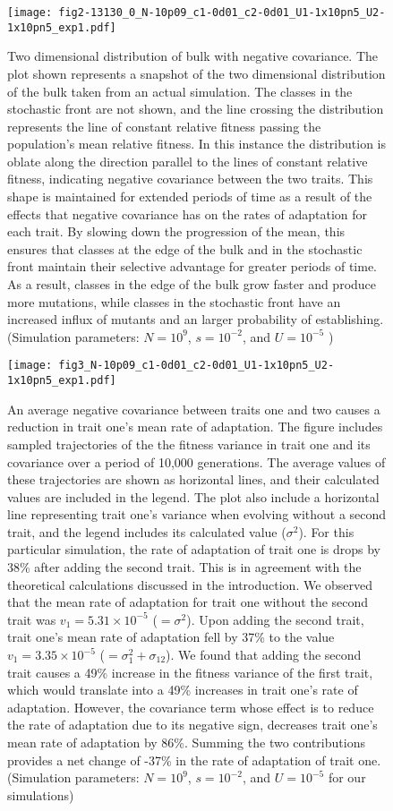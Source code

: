 \documentclass[11pt,twocolumn]{article}
\begin{document}
\begin{figure}
\texttt{[image: fig2-13130\_0\_N-10p09\_c1-0d01\_c2-0d01\_U1-1x10pn5\_U2-1x10pn5\_exp1.pdf]}
\label{Figure}
\caption{\footnotesize Two dimensional distribution of bulk with negative covariance. The plot shown represents a snapshot of the two dimensional distribution of the bulk taken from an actual simulation. The classes in the stochastic front are not shown, and the line crossing the distribution represents the line of constant relative fitness passing the population's mean relative fitness. In this instance the distribution is oblate along the direction parallel to the lines of constant relative fitness, indicating negative covariance between the two traits.  This shape is maintained for extended periods of time as a result of the effects that negative covariance has on the rates of adaptation for each trait.  By slowing down the progression of the mean, this ensures that classes at the edge of the bulk and in the stochastic front maintain their selective advantage for greater periods of time.  As a result, classes in the edge of the bulk grow faster and produce more mutations, while classes in the stochastic front have an increased influx of mutants and an larger probability of establishing. (Simulation parameters: $N=10^9$, $s=10^{-2}$, and $U=10^{-5}$ )}
\end{figure}

\begin{figure}
\texttt{[image: fig3\_N-10p09\_c1-0d01\_c2-0d01\_U1-1x10pn5\_U2-1x10pn5\_exp1.pdf]}
\label{Figure}
\caption{\footnotesize An average negative covariance between traits one and two causes a reduction in trait one's mean rate of adaptation. The figure includes sampled trajectories of the the fitness variance in trait one and its covariance over a period of 10,000 generations.  The average values of these trajectories are shown as horizontal lines, and their calculated values are included in the legend. The plot also include a horizontal line representing trait one's variance when evolving without a second trait, and the legend includes its calculated value ($\sigma^2$).  For this particular simulation, the rate of adaptation of trait one is drops by 38\% after adding the second trait. This is in agreement with the theoretical calculations  discussed in the introduction. We observed that the mean rate of adaptation for trait one without the second trait was $v_1 = 5.31 \times 10^{-5}$ ($= \sigma^2 $). Upon adding the second trait, trait one's mean rate of adaptation fell by 37\% to the value $v_1  = 3.35 \times 10^{-5}$ ($= \sigma_1^2+\sigma_{12}$). We found that adding the second trait causes a 49\% increase in the fitness variance of the first trait, which would translate into a 49\% increases in trait one's rate of adaptation. However, the covariance term whose effect is to reduce the rate of adaptation due to its negative sign, decreases trait one's mean rate of adaptation by 86\%. Summing the two contributions provides a net change of -37\% in the rate of adaptation of trait one. (Simulation parameters: $N=10^9$, $s=10^{-2}$, and $U=10^{-5}$ for our simulations)}
\end{figure}
\end{document}
